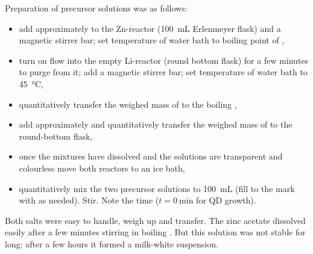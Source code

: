 \documentclass[webedition,openright,titles,swedish,english]{LuaUUThesis}\usepackage[]{graphicx}\usepackage[]{xcolor}
\begin{document}
Preparation of precursor solutions was as follows:
\begin{itemize}[after=\vspace{\baselineskip}]
\item add approximately  to the Zn-reactor (\qty{100}{\mL} Erlenmeyer flask)
      and a magnetic stirrer bar; set temperature of water bath to boiling point of ,
\item turn on  flow into the empty Li-reactor (round bottom flask) for a few minutes
      to purge  from it; add a magnetic stirrer bar;
      set temperature of water bath to \qty{45}{\celsius},
\item quantitatively transfer the weighed mass of  to the boiling ,
\item add approximately  and quantitatively transfer the weighed mass
      of  to the round-bottom flask,
\item once the mixtures have dissolved and the solutions
      are transparent and colourless move both reactors to an ice bath,
\item quantitatively mix the two precursor solutions to \qty{100}{\mL}
      (fill to the mark with  as needed). Stir.
      Note the time ($t=\qty{0}{\minute}$ for \gls{QD} growth).
\end{itemize}

Both salts were easy to handle, weigh up and transfer.
The zinc acetate  dissolved easily after
a few minutes stirring in boiling .
But this solution was not stable for long: after a few hours it formed a milk-white suspension.
\end{document}
